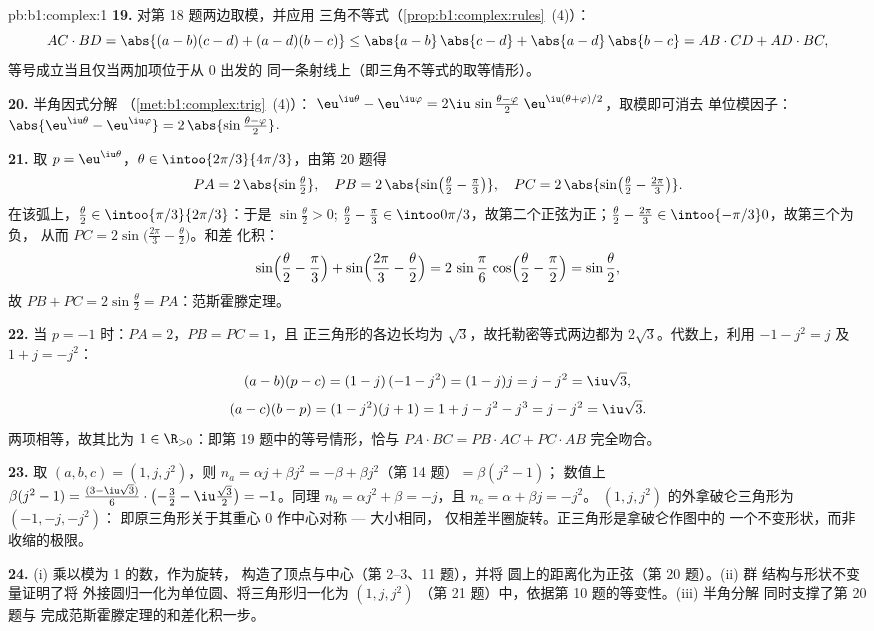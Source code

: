 \begin{solution}{pb:b1:complex:1}
\textbf{19.} 对第 18 题两边取模，并应用
三角不等式（\cref{prop:b1:complex:rules}~(4)）：
\[
AC \cdot BD = \abs{(a-b)(c-d) + (a-d)(b-c)}
\leq \abs{a-b}\,\abs{c-d} + \abs{a-d}\,\abs{b-c}
= AB \cdot CD + AD \cdot BC ,
\]
等号成立当且仅当两加项位于从 $0$ 出发的
同一条射线上（即三角不等式的取等情形）。

\textbf{20.} 半角因式分解
（\cref{met:b1:complex:trig}~(4)）：
$\eu^{\iu\theta} - \eu^{\iu\varphi} = 2\iu\,\sin\frac{\theta -
\varphi}2\;\eu^{\iu(\theta + \varphi)/2}$，取模即可消去
单位模因子：$\abs{\eu^{\iu\theta} - \eu^{\iu\varphi}}
= 2\,\abs{\sin\frac{\theta - \varphi}2}$.

\textbf{21.} 取 $p = \eu^{\iu\theta}$，$\theta \in
\intoo{2\pi/3}{4\pi/3}$，由第 20 题得
\[
PA = 2\,\abs{\sin\tfrac\theta2},
\quad
PB = 2\,\abs{\sin\bigl(\tfrac\theta2 - \tfrac\pi3\bigr)},
\quad
PC = 2\,\abs{\sin\bigl(\tfrac\theta2 - \tfrac{2\pi}3\bigr)} .
\]
在该弧上，$\frac\theta2 \in \intoo{\pi/3}{2\pi/3}$：于是
$\sin\frac\theta2 > 0$; $\frac\theta2 - \frac\pi3 \in
\intoo0{\pi/3}$，故第二个正弦为正；$\frac\theta2 -
\frac{2\pi}3 \in \intoo{-\pi/3}0$，故第三个为负，
从而 $PC = 2\sin\bigl(\frac{2\pi}3 - \frac\theta2\bigr)$。和差
化积：
\[
\sin\Bigl(\frac\theta2 - \frac\pi3\Bigr) +
\sin\Bigl(\frac{2\pi}3 - \frac\theta2\Bigr)
= 2\,\sin\frac\pi6\,\cos\Bigl(\frac\theta2 - \frac\pi2\Bigr)
= \sin\frac\theta2 ,
\]
故 $PB + PC = 2\sin\frac\theta2 = PA$：范斯霍滕定理。

\textbf{22.} 当 $p = -1$ 时：$PA = 2$，$PB = PC = 1$，且
正三角形的各边长均为 $\sqrt3$，故托勒密等式两边都为
$2\sqrt3$。代数上，利用 $-1 - j^2 = j$ 及
$1 + j = -j^2$：
\[
(a - b)(p - c) = (1 - j)\,(-1 - j^2) = (1 - j)j = j - j^2
= \iu\sqrt3 ,
\]
\[
(a - c)(b - p) = (1 - j^2)(j + 1) = 1 + j - j^2 - j^3
= j - j^2 = \iu\sqrt3 .
\]
两项相等，故其比为
$1 \in \R_{>0}$：即第 19 题中的等号情形，恰与 $PA
\cdot BC = PB \cdot AC + PC \cdot AB$ 完全吻合。

\textbf{23.} 取 $(a, b, c) = (1, j, j^2)$，则 $n_a = \alpha j +
\beta j^2 = -\beta + \beta j^2$（第 14 题）$= \beta(j^2 - 1)$；
数值上 $\beta(j^2 - 1) = \frac{(3 - \iu\sqrt3)}6 \cdot
\bigl(-\frac32 - \iu\frac{\sqrt3}2\bigr) = -1$。同理 $n_b =
\alpha j^2 + \beta = -j$，且 $n_c = \alpha + \beta j = -j^2$。
$(1, j, j^2)$ 的外拿破仑三角形为 $(-1, -j, -j^2)$：
即原三角形关于其重心 $0$ 作中心对称 --- 大小相同，
仅相差半圈旋转。正三角形是拿破仑作图中的
一个不变形状，而非收缩的极限。

\textbf{24.} (i) 乘以模为 1 的数，作为旋转，
构造了顶点与中心（第 2--3、11 题），并将
圆上的距离化为正弦（第 20 题）。(ii) 群
结构与形状不变量证明了将
外接圆归一化为单位圆、将三角形归一化为 $(1, j, j^2)$
（第 21 题）中，依据第 10 题的等变性。(iii) 半角分解
同时支撑了第 20 题与
完成范斯霍滕定理的和差化积一步。


\end{solution}

